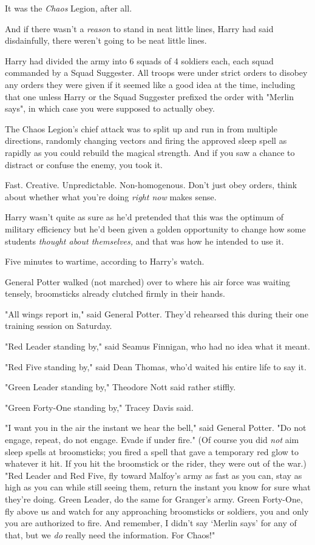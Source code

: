 It was the \emph{Chaos} Legion, after all.

And if there wasn't a \emph{reason} to stand in neat little lines, Harry had
said disdainfully, there weren't going to be neat little lines.

Harry had divided the army into 6 squads of 4 soldiers each, each squad
commanded by a Squad Suggester. All troops were under strict orders to disobey
any orders they were given if it seemed like a good idea at the time, including
that one{\el} unless Harry or the Squad Suggester prefixed the order with
"Merlin says", in which case you were supposed to actually obey.

The Chaos Legion's chief attack was to split up and run in from multiple
directions, randomly changing vectors and firing the approved sleep spell as
rapidly as you could rebuild the magical strength. And if you saw a chance to
distract or confuse the enemy, you took it.

Fast. Creative. Unpredictable. Non-homogenous. Don't just obey orders, think
about whether what you're doing \emph{right now} makes sense.

Harry wasn't quite as sure as he'd pretended that this was the optimum of
military efficiency{\el} but he'd been given a golden opportunity to change
how some students \emph{thought about themselves,} and that was how he intended
to use it.

Five minutes to wartime, according to Harry's watch.

General Potter walked (not marched) over to where his air force was waiting
tensely, broomsticks already clutched firmly in their hands.

"All wings report in," said General Potter. They'd rehearsed this during their
one training session on Saturday.

"Red Leader standing by," said Seamus Finnigan, who had no idea what it meant.

"Red Five standing by," said Dean Thomas, who'd waited his entire life to say
it.

"Green Leader standing by," Theodore Nott said rather stiffly.

"Green Forty-One standing by," Tracey Davis said.

"I want you in the air the instant we hear the bell," said General Potter. "Do
not engage, repeat, do not engage. Evade if under fire." (Of course you did
\emph{not} aim sleep spells at broomsticks; you fired a spell that gave a
temporary red glow to whatever it hit. If you hit the broomstick or the rider,
they were out of the war.) "Red Leader and Red Five, fly toward Malfoy's army
as fast as you can, stay as high as you can while still seeing them, return the
instant you know for sure what they're doing. Green Leader, do the same for
Granger's army. Green Forty-One, fly above us and watch for any approaching
broomsticks or soldiers, you and only you are authorized to fire. And remember,
I didn't say `Merlin says' for any of that, but we \emph{do} really need the
information. For Chaos!"


